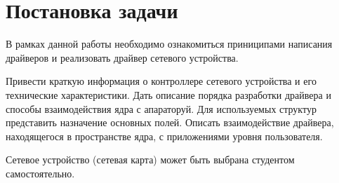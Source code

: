 \newpage
\section*{Постановка задачи}

\vspace{2em}

В рамках данной работы необходимо ознакомиться приниципами написания драйверов и реализовать драйвер сетевого устройства.

\vspace{1em}

Привести краткую информация о контроллере сетевого устройства и его технические характеристики. Дать описание порядка разработки драйвера и способы взаимодействия ядра с апараторуй. Для используемых структур представить назначение основных полей. Описать взаимодействие драйвера, находящегося в пространстве ядра, с приложениями уровня пользователя.

\vspace{1em}

Сетевое устройство (сетевая карта) может быть выбрана студентом самостоятельно.
